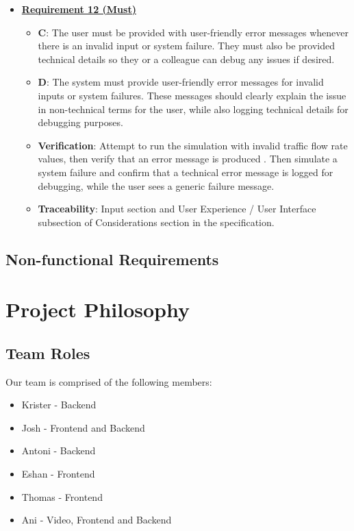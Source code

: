 \documentclass{article}
\begin{document}
\begin{itemize}
    \item \textbf{\underline{Requirement 12 (Must)}}
    \begin{itemize}
        \item \textbf{C}: The user must be provided with user-friendly error messages whenever there is an invalid 
        input or system failure. They must also be provided technical details so they or a colleague can debug any 
        issues if desired.
        \item \textbf{D}: The system must provide user-friendly error messages for invalid inputs or system failures. 
        These messages should clearly explain the issue in non-technical terms for the user, while also logging 
        technical details for debugging purposes.
        \item \textbf{Verification}: Attempt to run the simulation with invalid traffic flow rate values, then verify 
        that an error message is produced . Then simulate a system failure and confirm that a technical error message 
        is logged for debugging, while the user sees a generic failure message.
        \item\textbf{Traceability}: Input section and User Experience / User Interface subsection of Considerations 
        section in the specification.
    \end{itemize}
\end{itemize}

\subsection{Non-functional Requirements}

\section{Project Philosophy}
\subsection{Team Roles}
Our team is comprised of the following members:

\begin{itemize}
  \item Krister - Backend 
  \item Josh - Frontend and Backend 
  \item Antoni - Backend 
  \item Eshan - Frontend
  \item Thomas - Frontend
  \item Ani - Video, Frontend and Backend
\end{itemize}
\end{document}
